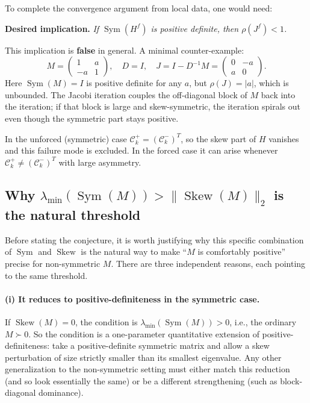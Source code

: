 \documentclass{article}
\newcommand{\Sym}{\operatorname{Sym}}
\newcommand{\Skew}{\operatorname{Skew}}
\begin{document}
To complete the convergence argument from local data, one would need:

\medskip
\textbf{Desired implication.} \textit{If $\Sym(H^f)$ is positive definite, then $\rho(J^f) < 1$.}
\medskip

This implication is \textbf{false} in general. A minimal counter-example:
\[
    M = \begin{pmatrix} 1 & a \\ -a & 1 \end{pmatrix},
    \quad D = I,
    \quad J = I - D^{-1}M = \begin{pmatrix} 0 & -a \\ a & 0 \end{pmatrix}.
\]
Here $\Sym(M) = I$ is positive definite for any $a$, but $\rho(J) = |a|$,
which is unbounded. The Jacobi iteration couples the off-diagonal
block of $M$ back into the iteration; if that block is large and skew-symmetric, the
iteration spirals out even though the symmetric part stays positive.

In the unforced (symmetric) case $\mathcal{C}^+_k = (\mathcal{C}^-_k)^T$, so the skew
part of $H$ vanishes and this failure mode is excluded. In the forced case it can arise
whenever $\mathcal{C}^+_k \neq (\mathcal{C}^-_k)^T$ with large asymmetry.

\subsection*{Why $\lambda_{\min}(\Sym(M)) > \|\Skew(M)\|_2$ is the natural threshold}

Before stating the conjecture, it is worth justifying why this specific
combination of $\Sym$ and $\Skew$ is the natural way to make ``$M$ is comfortably
positive'' precise for non-symmetric $M$. There are three independent reasons,
each pointing to the same threshold.

\paragraph{(i) It reduces to positive-definiteness in the symmetric case.}
If $\Skew(M) = 0$, the condition is $\lambda_{\min}(\Sym(M)) > 0$, i.e., the
ordinary $M \succ 0$. So the condition is a one-parameter quantitative
extension of positive-definiteness: take a positive-definite symmetric matrix
and allow a skew perturbation of size strictly smaller than its smallest
eigenvalue. Any other generalization to the non-symmetric setting must either
match this reduction (and so look essentially the same) or be a different
strengthening (such as block-diagonal dominance).
\end{document}
